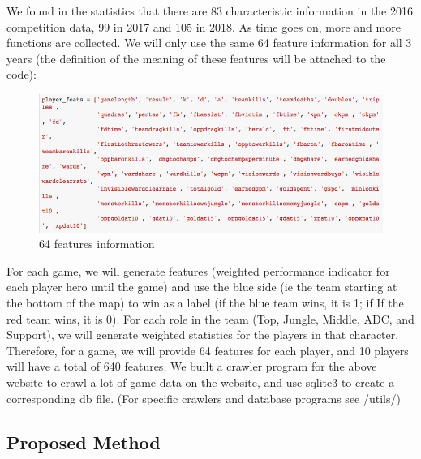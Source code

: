 \documentclass[fleqn,10pt]{wlscirep}
\begin{document}
We found in the statistics that there are 83 characteristic information in the 2016 competition data, 99 in 2017 and 105 in 2018. As time goes on, more and more functions are collected. We will only use the same 64 feature information for all 3 years (the definition of the meaning of these features will be attached to the code):

\begin{figure}[ht]
\centering
\includegraphics[width=\linewidth]{1.png}
\caption{64 features information}
\label{fig:1}
\end{figure}

For each game, we will generate features (weighted performance indicator for each player hero until the game) and use the blue side (ie the team starting at the bottom of the map) to win as a label (if the blue team wins, it is 1; if If the red team wins, it is 0). For each role in the team (Top, Jungle, Middle, ADC, and Support), we will generate weighted statistics for the players in that character. Therefore, for a game, we will provide 64 features for each player, and 10 players will have a total of 640 features. We built a crawler program for the above website to crawl a lot of game data on the website, and use sqlite3 to create a corresponding db file. (For specific crawlers and database programs see /utils/)

\subsection*{Proposed Method}
\end{document}
